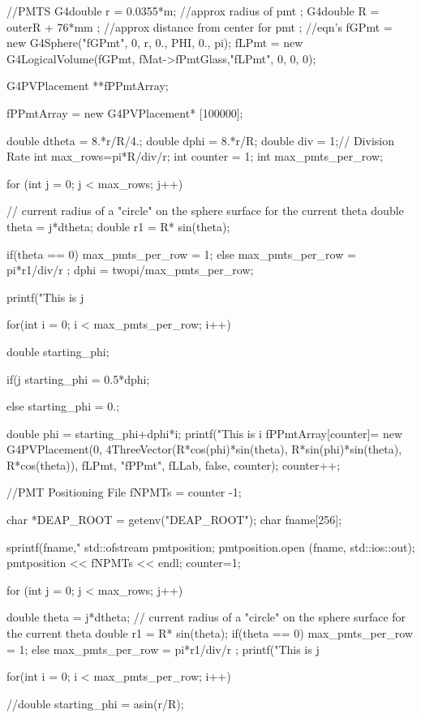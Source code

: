 \documentclass[11pt,a4paper,oneside]{report}
\begin{document}
\begin{code}
{//PMTS
	G4double r = 0.0355*m; //approx radius of pmt ;
	G4double R = outerR + 76*mm ; //approx distance from center for pmt ;
//eqn's
	fGPmt
= new G4Sphere("fGPmt", 0, r, 0., PHI, 0., pi);
	fLPmt
= new G4LogicalVolume(fGPmt,   fMat->fPmtGlass,"fLPmt", 0, 0, 0);

	G4PVPlacement **fPPmtArray;	

	fPPmtArray = new G4PVPlacement* [100000];
	
	double dtheta = 8.*r/R/4.;
	double dphi = 8.*r/R; 
	double div = 1;// Division Rate
	int max_rows=pi*R/div/r; 
	int counter = 1;
	int max_pmts_per_row;	
	
	for (int j = 0; j < max_rows; j++){

// current radius of a "circle" on the sphere surface for the current theta 		
		double theta = j*dtheta;
		double r1 = R* sin(theta);
		
		if(theta == 0) 
			max_pmts_per_row = 1; 
		else {
			max_pmts_per_row = pi*r1/div/r ;
		}
		dphi = twopi/max_pmts_per_row;

		printf("This is j %
		
		for(int i = 0; i < max_pmts_per_row; i++){

			double starting_phi;
			
			if(j%
				starting_phi = 0.5*dphi;				
			} else {
				starting_phi = 0.;
			}
			
			double phi =  starting_phi+dphi*i;
			printf("This is i %
			fPPmtArray[counter]= new G4PVPlacement(0,
4ThreeVector(R*cos(phi)*sin(theta), R*sin(phi)*sin(theta), R*cos(theta)), 
fLPmt, "fPPmt", fLLab, false, counter);
			counter++;	

		}
	}
	
//PMT Positioning File
	fNPMTs = counter -1;
	
	char *DEAP_ROOT = getenv("DEAP_ROOT");
	char fname[256];
	
	sprintf(fname,"%
	std::ofstream pmtposition;
	pmtposition.open (fname, std::ios::out);
	pmtposition << fNPMTs << endl;
	counter=1;
	
	for (int j = 0; j < max_rows; j++){

		double theta = j*dtheta;
// current radius of a "circle" on the sphere surface for the current theta 
		double r1 = R* sin(theta);
		if(theta == 0) 
			max_pmts_per_row = 1; 
		else {
			max_pmts_per_row = pi*r1/div/r ; 
		}
		printf("This is j %
		
		for(int i = 0; i < max_pmts_per_row; i++){
			//double starting_phi = asin(r/R);
			
}}
\end{code}
\end{document}
